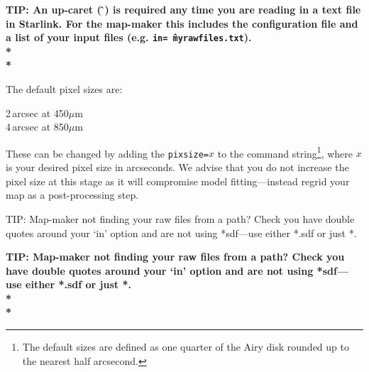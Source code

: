 \documentclass[twoside,11pt]{article}
\newcommand{\htmladdnormallink}[2]{#1}
\newcommand{\htmlref}[2]{#1}
\newenvironment{latexonly}{}{}
\newcommand{\latexhtml}[2]{#1}
\newcommand{\xref}[3]{#1}
\renewcommand{\_}{\texttt{\symbol{95}}}
\newenvironment{fmpage}[1]{\begin{lrbox}{\fmbox}\begin{minipage}{#1}}{\end{minipage}\end{lrbox}\fbox{\usebox{\fmbox}}}
\newcommand{\starlink}{\htmladdnormallink{Starlink}{http://starlink.jach.hawaii.edu}}
\newcommand{\task}[1]{\textsf{#1}}
\newcommand{\makemap}{\xref{\task{makemap}}{sun258}{MAKEMAP}}
\newcommand{\smurfsun}{\xref{\textbf{SUN/258}}{sun258}{}}
\newcommand{\cref}[3]{\latexhtml{#1~\ref{#2}}{\htmlref{#3}{#2}}}
\begin{document}
\begin{htmlonly}
\textbf{TIP: An up-caret (\,\^\,) is required any time you are reading in
a  text file in \starlink. For the map-maker this includes the
configuration file and a list of your input files (e.g. \texttt{in=\^\,myrawfiles.txt}).\\*\\*}
\end{htmlonly}

The default pixel sizes are:

2\,arcsec at 450$\mu$m\\
4\,arcsec at 850$\mu$m

These can be changed by adding the \texttt{pixsize=}$x$ to the
command string\footnote{The default sizes are defined as one quarter
of the Airy disk rounded up to the nearest half arcsecond.}, where $x$
is your desired pixel size in arcseconds. We advise that you do not
increase the pixel size at this stage as it will compromise model
fitting---instead regrid your map as a post-processing step.


\begin{latexonly}
\begin{center}
\begin{fmpage}{0.95\linewidth}
\vspace{0.1cm}
TIP: Map-maker not finding your raw files from a path? Check you have
double quotes around your `in' option and are not using *sdf---use
either *.sdf or just *.
\end{fmpage}
\end{center}
\end{latexonly}

\begin{htmlonly}
\textbf{TIP: Map-maker not finding your raw files from a path? Check
you have double quotes around your `in' option and are not using
*sdf---use either *.sdf or just *.\\*\\*}
\end{htmlonly}
\end{document}
